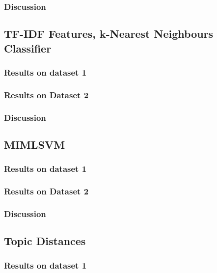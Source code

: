 \subsubsection{Discussion}




\subsection{TF-IDF Features, k-Nearest Neighbours Classifier}

\subsubsection{Results on dataset 1}

\subsubsection{Results on Dataset 2}

\subsubsection{Discussion}


\subsection{MIMLSVM}

\subsubsection{Results on dataset 1}

\subsubsection{Results on Dataset 2}

\subsubsection{Discussion}



\subsection{Topic Distances}

\subsubsection{Results on dataset 1}

